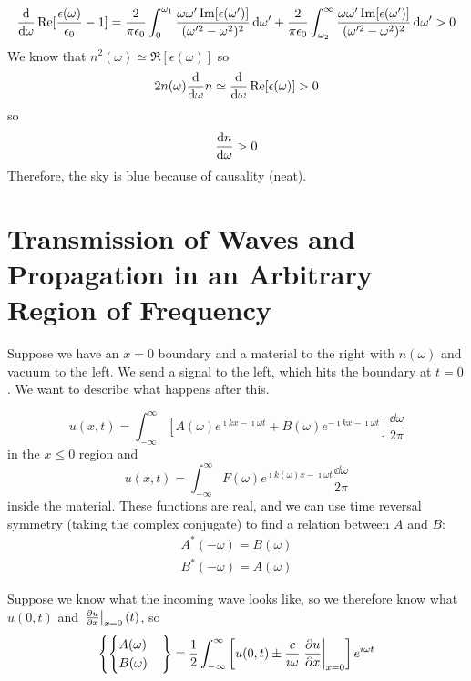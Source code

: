 \documentclass[a4paper,twoside,master.tex]{subfiles}
\begin{document}
\begin{equation}
    \dv{\omega} \Re[\frac{\epsilon(\omega)}{\epsilon_0} - 1] = \frac{2}{\pi\epsilon_0} \int_0^{\omega_1} \frac{\omega\omega'\Im[\epsilon(\omega')]}{(\omega'^2 - \omega^2)^2} \dd{\omega'} + \frac{2}{\pi\epsilon_0} \int_{\omega_2}^{\infty} \frac{\omega\omega'\Im[\epsilon(\omega')]}{(\omega'^2 - \omega^2)^2} \dd{\omega'} > 0
\end{equation}
We know that $ n^2(\omega) \simeq \Re[\epsilon(\omega)] $ so
\begin{equation}
    2 n(\omega) \dv{\omega}n \simeq \dv{\omega}\Re[\epsilon(\omega)] > 0
\end{equation}
so
\begin{equation}
    \dv{n}{\omega} > 0
\end{equation}
Therefore, the sky is blue because of causality (neat).

\section{Transmission of Waves and Propagation in an Arbitrary Region of Frequency}
\label{sec:transmission_of_waves_and_propagation_in_an_arbitrary_region_of_frequency}

Suppose we have an $ x = 0 $ boundary and a material to the right with $ n(\omega) $ and vacuum to the left. We send a signal to the left, which hits the boundary at $ t = 0 $. We want to describe what happens after this.

\begin{equation}
    u(x,t) = \int_{- \infty}^{\infty} \left[ A(\omega) e^{\imath k x - \imath \omega t} + B(\omega) e^{- \imath k x - \imath \omega t} \right] \frac{\dd{\omega}}{2 \pi}
\end{equation}
in the $ x \leq 0 $ region and
\begin{equation}
    u(x,t) = \int_{- \infty}^{\infty} F(\omega) e^{\imath k(\omega) x - \imath \omega t} \frac{\dd{\omega}}{2 \pi}
\end{equation}
inside the material. These functions are real, and we can use time reversal symmetry (taking the complex conjugate) to find a relation between $ A $ and $ B $:
\begin{gather}
    A^*(- \omega) = B(\omega) \\
    B^*(- \omega) = A(\omega)
\end{gather}

Suppose we know what the incoming wave looks like, so we therefore know what $ u(0, t) $ and $ \eval{\pdv{u}{x}}_{x=0}(t) $, so
\begin{equation}
    \left\{ \begin{cases} A(\omega) \\ B(\omega) \end{cases} \right\} = \frac{1}{2} \int_{- \infty}^{\infty} \left[ u(0,t) \pm \frac{c}{\imath \omega} \eval{\pdv{u}{x}}_{x=0} \right] e^{\imath \omega t}
\end{equation}
\end{document}
